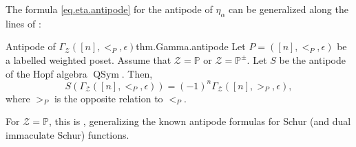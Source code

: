 \documentclass[numbers=enddot,12pt,final,onecolumn,notitlepage]{scrartcl}%
\newcommand{\PP}{\mathbb{P}} %
\newcommand{\QSym}{\operatorname{QSym}}
\newcommand{\calZ}{\mathcal{Z}}
\newcommand{\tup}[1]{\left( #1 \right)}
\newcommand{\0}{\phantom{c}}
\begin{document}
The formula \eqref{eq.eta.antipode} for the antipode of $\eta_\alpha$ can be generalized
along the lines of \cite{Gri17}:

\begin{theorem}{Antipode of $\Gamma_\mathcal{Z}([n], <_P, \epsilon)$}{thm.Gamma.antipode}
Let $P = ([n], <_P, \epsilon)$ be a labelled weighted poset.
Assume that $\calZ = \PP$ or $\calZ = \PP^{\pm}$.
Let $S$ be the antipode of the Hopf algebra $\QSym$. Then,
\begin{equation}
S\tup{ \Gamma_{\calZ}([n], <_P, \epsilon) }
= \tup{-1}^n \Gamma_{\calZ}([n], >_P, \epsilon) ,
\label{eq.thm.Gamma.antipode.eq}
\end{equation}
where $>_P$ is the opposite relation to $<_P$.
\end{theorem}


For $\calZ = \PP$, this is \cite[Corollary 9]{Gri17}, generalizing the known antipode formulas for Schur (and dual immaculate Schur) functions.

\printbibliography
\end{document}
